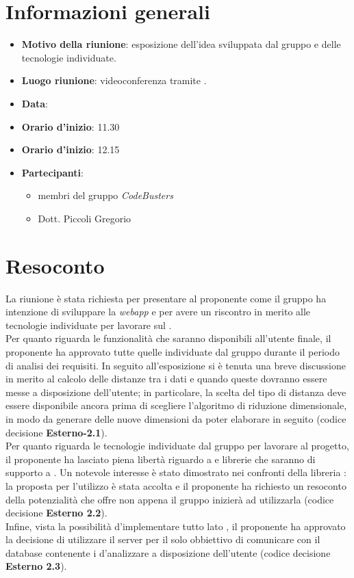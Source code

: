 \section{Informazioni generali}
\begin{itemize}
\item \textbf{Motivo della riunione}: esposizione dell'idea sviluppata dal gruppo e delle tecnologie individuate.
\item \textbf{Luogo riunione}: videoconferenza tramite .
\item \textbf{Data}: \Data{}
\item \textbf{Orario d'inizio}: 11.30 
\item \textbf{Orario d'inizio}: 12.15 
\item \textbf{Partecipanti}:
	\begin{itemize}
	\item membri del gruppo \textit{CodeBusters}
	\item Dott. Piccoli Gregorio
	\end{itemize}
\end{itemize}

\section{Resoconto}
La riunione è stata richiesta per presentare al proponente come il gruppo ha intenzione di sviluppare la \textit{webapp}\glo{} e per avere un riscontro in merito alle tecnologie individuate per lavorare sul . \\
Per quanto riguarda le funzionalità che saranno disponibili all'utente finale, il proponente ha approvato tutte quelle individuate dal gruppo durante il periodo di analisi dei requisiti. In seguito all'esposizione si è tenuta una breve discussione in merito al calcolo delle distanze tra i dati e quando queste dovranno essere messe a disposizione dell'utente; in particolare, la scelta del tipo di distanza deve essere disponibile ancora prima di scegliere l'algoritmo di riduzione dimensionale, in modo da generare delle nuove dimensioni da poter elaborare in seguito (codice decisione \textbf{Esterno-2.1}). \\
Per quanto riguarda le tecnologie individuate dal gruppo per lavorare al progetto, il proponente ha lasciato piena libertà riguardo a  e librerie che saranno di supporto a . Un notevole interesse è stato dimostrato nei confronti della libreria : la proposta per l'utilizzo è stata accolta e il proponente ha richiesto un resoconto della potenzialità che offre non appena il gruppo inizierà ad utilizzarla (codice decisione \textbf{Esterno 2.2}). \\
Infine, vista la possibilità d'implementare tutto lato , il proponente ha approvato la decisione di utilizzare il server per il solo obbiettivo di comunicare con il database contenente i  d'analizzare a disposizione dell'utente (codice decisione \textbf{Esterno 2.3}).